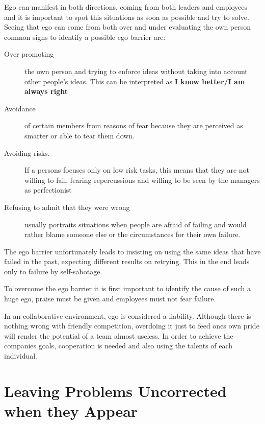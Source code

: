 Ego can manifest in both directions, coming from both leaders and employees and it is important to spot this situations as soon as possible and try to solve. Seeing that ego can come from both over and under evaluating the own person common signs to identify a possible ego barrier are:
\begin{description}
\item [Over promoting] the own person and trying to enforce ideas without taking into account other people's ideas. This can be interpreted as \textbf{I know better/I am always right}
\item [Avoidance] of certain members from reasons of fear because they are perceived as smarter or able to tear them down.
\item [Avoiding risks.] If a persons focuses only on low risk tasks, this means that they are not willing to fail, fearing repercussions and willing to be seen by the managers as perfectionist
\item [Refusing to admit that they were wrong] usually portraits situations when people are afraid of failing and would rather blame someone else or the circumstances for their own failure.
\end{description}

The ego barrier unfortunately leads to insisting on using the same ideas that have failed in the past, expecting different results on retrying. This in the end leads only to failure by self-sabotage.

To overcome the ego barrier it is first important to identify the cause of such a huge ego, praise must be given and employees must not fear failure.

In an collaborative environment, ego is considered a liability. Although there is nothing wrong with friendly competition, overdoing it just to feed ones own pride will render the potential of a team almost useless. In order  to achieve the companies goals, cooperation is needed and also using the talents of each individual. 

\section{Leaving Problems Uncorrected when they Appear}
\label{sec:uncorrected}
